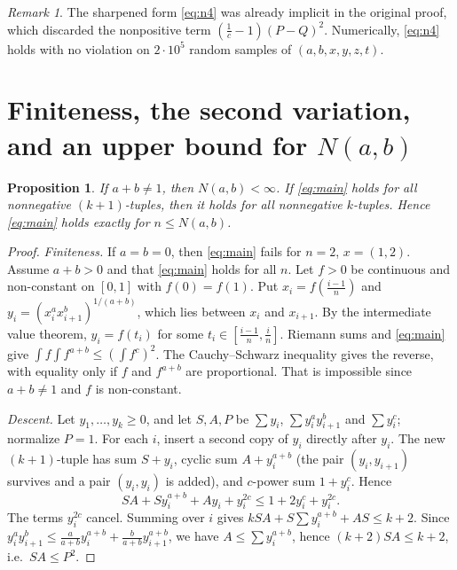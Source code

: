 \documentclass[11pt]{article}
\newtheorem{proposition}[theorem]{Proposition}
\theoremstyle{remark}
\newtheorem{remark}[theorem]{Remark}
\numberwithin{equation}{section}
\begin{document}
\begin{remark}
The sharpened form \eqref{eq:n4} was already implicit in the original proof, which discarded the
nonpositive term $(\frac1c-1)(P-Q)^2$. Numerically, \eqref{eq:n4} holds with no violation on
$2\cdot10^5$ random samples of $(a,b,x,y,z,t)$.
\end{remark}

\section{Finiteness, the second variation, and an upper bound for $N(a,b)$}

\begin{proposition}\label{prop:finite}
If $a+b\ne1$, then $N(a,b)<\infty$. If \eqref{eq:main} holds for all nonnegative $(k+1)$-tuples,
then it holds for all nonnegative $k$-tuples. Hence \eqref{eq:main} holds exactly for
$n\le N(a,b)$.
\end{proposition}

\begin{proof}
\emph{Finiteness.} If $a=b=0$, then \eqref{eq:main} fails for $n=2$, $x=(1,2)$. Assume
$a+b>0$ and that \eqref{eq:main} holds for all $n$. Let $f>0$ be continuous and non-constant on
$[0,1]$ with $f(0)=f(1)$. Put $x_i=f(\frac{i-1}{n})$ and
$y_i=(x_i^ax_{i+1}^b)^{1/(a+b)}$, which lies between $x_i$ and $x_{i+1}$. By the
intermediate value theorem, $y_i=f(t_i)$ for some $t_i\in[\frac{i-1}n,\frac in]$. Riemann sums
and \eqref{eq:main} give
$\int f\int f^{a+b}\le(\int f^c)^2$. The Cauchy--Schwarz inequality gives the reverse, with
equality only if $f$ and $f^{a+b}$ are proportional. That is impossible since $a+b\ne1$ and $f$ is
non-constant.

\emph{Descent.} Let $y_1,\dots,y_k\ge0$, and let $S,A,P$ be $\sum y_i$,
$\sum y_i^ay_{i+1}^b$ and $\sum y_i^c$; normalize $P=1$. For each $i$, insert a second copy of
$y_i$ directly after $y_i$. The new $(k+1)$-tuple has sum $S+y_i$, cyclic sum $A+y_i^{a+b}$
(the pair $(y_i,y_{i+1})$ survives and a pair $(y_i,y_i)$ is added), and $c$-power sum
$1+y_i^c$. Hence
\[
SA+Sy_i^{a+b}+Ay_i+y_i^{2c}\le 1+2y_i^c+y_i^{2c}.
\]
The terms $y_i^{2c}$ cancel. Summing over $i$ gives $kSA+S\sum y_i^{a+b}+AS\le k+2$. Since
$y_i^ay_{i+1}^b\le\frac{a}{a+b}y_i^{a+b}+\frac{b}{a+b}y_{i+1}^{a+b}$, we have
$A\le\sum y_i^{a+b}$, hence $(k+2)SA\le k+2$, i.e.\ $SA\le P^2$.
\end{proof}
\end{document}

